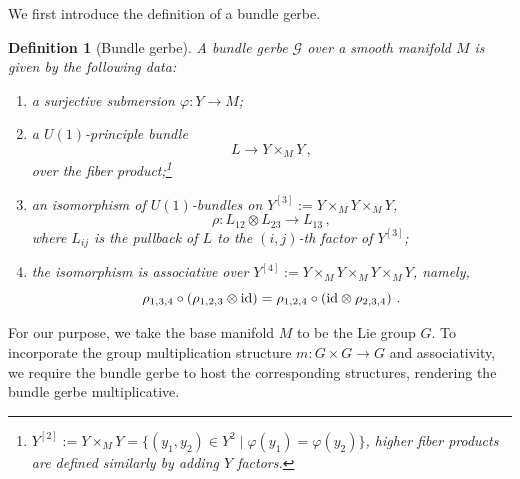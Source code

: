 \documentclass[a4paper,11pt]{article}
\newtheorem{defn}[lemma]{Definition}
\newcommand{\be}{\begin{equation}}
\newcommand{\ee}{\end{equation}}
\begin{document}
We first introduce the definition of a bundle gerbe.
\begin{defn}[Bundle gerbe]
    A bundle gerbe $\mathscr{G}$ over a smooth manifold $M$ is given by the following data:
    \begin{enumerate}
        \item a surjective submersion $\varphi:Y\to M$;
        \item a $U(1)$-principle bundle
        \be L\to Y\times_M Y \,, \ee
        over the fiber product;\footnote{%
        $Y^{[2]}:=Y \times_M Y = \{(y_1, y_2) \in Y^2 \mid \varphi(y_1)=\varphi(y_2)\}$, higher fiber products are defined similarly by adding $Y$ factors.}
        \item an isomorphism of $U(1)$-bundles on $Y^{[3]} := Y\times_M Y\times_M Y$,
        \be  \rho: L_{12} \otimes L_{23} \to  L_{13}\,, \ee
        where $L_{i j}$ is the pullback of $L$ to the $(i,j)$-th factor of $Y^{[3]}$; 
        \item the isomorphism is associative over $Y^{[4]} := Y\times_M Y\times_M Y\times_M Y$, namely,
        \be \rho_{1,3,4}\circ(\rho_{1,2,3}\otimes {\rm id} )  = \rho_{1,2,4} \circ( {\rm id}\otimes \rho_{2,3,4} ) \ .\ee
    \end{enumerate}
\end{defn}
For our purpose, we take the base manifold $M$ to be the Lie group $G$. To incorporate the group multiplication structure $m:G\times G \to G$ and associativity, we require the bundle gerbe to host the corresponding structures, rendering the bundle gerbe multiplicative.
\end{document}

